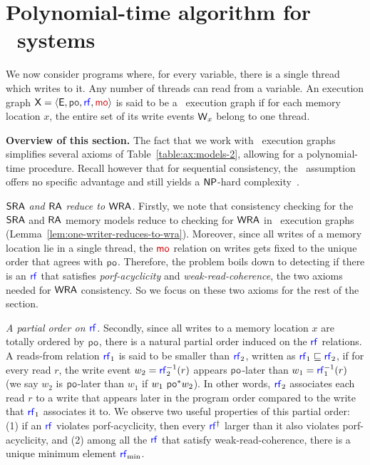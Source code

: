 \section{Polynomial-time algorithm for \onewriter\ systems}
\label{sec:onewriter}

We now consider programs where, for every variable, there is a single thread which writes to it. Any number of threads can read from a variable. An execution graph $\ex = \tuple{\E, \po, \rf, \mo}$ is said to be a \onewriter\ execution graph if for each memory location $x$, the entire set of its write events $\mathsf{W}_x$ belong to one thread. 

\noindent \textbf{Overview of this section.} The fact that we work with \onewriter\ execution graphs simplifies several axioms of Table~\ref{table:ax:models-2}, allowing for  a polynomial-time procedure. Recall however that for sequential consistency, the \onewriter\ assumption offers no specific advantage and still yields a $\mathsf{NP}$-hard complexity~\cite{gibbons}. 

\noindent \textit{$\mathsf{SRA}$ and $\mathsf{RA}$ reduce to $\mathsf{WRA}$.} Firstly, we note that consistency checking for the $\mathsf{SRA}$ and $\mathsf{RA}$ memory models reduce to checking for $\mathsf{WRA}$ in \onewriter\ execution graphs (Lemma~\ref{lem:one-writer-reduces-to-wra}). Moreover, since all writes of a memory location lie in a single thread, the $\mo$ relation on writes gets fixed to the unique order that agrees with $\po$.  Therefore, the problem boils down to detecting if there is an $\rf$ that satisfies \emph{porf-acyclicity} and \emph{weak-read-coherence}, the two axioms needed for $\mathsf{WRA}$ consistency. So we focus on these two axioms for the rest of the section. 

\noindent \textit{A partial order on $\rf$.} Secondly, since all writes to a memory location $x$ are totally ordered by $\po$, there is a natural partial order induced on the $\rf$ relations. A reads-from relation $\rf_1$ is said to be smaller than $\rf_2$, written as $\rf_1 \sqsubseteq \rf_2$, if for every 
read $r$, the write event $w_2 = \rf^{-1}_2(r)$ appears $\po$-later than $w_1 = \rf^{-1}_1(r)$ (we say $w_2$ is $\po$-later than $w_1$ if $w_1~\po^*w_2$). In other words, $\rf_2$ associates each read $r$ to a write that appears later in the program order compared to the write that $\rf_1$ associates it to\label{order}. %
We observe two useful properties of this partial order: (1) if an $\rf$ violates porf-acyclicity, then every $\rf^{\dagger}$ larger than it also violates porf-acyclicity, and (2) among all the $\rf$ that satisfy weak-read-coherence, there is a unique minimum element $\rf_{\min}$.

